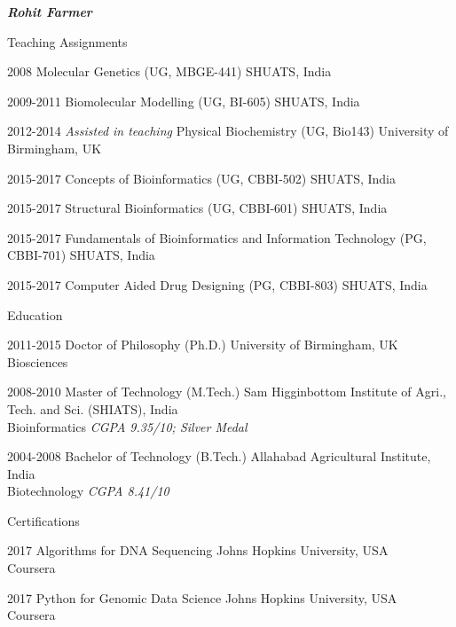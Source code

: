 \documentclass[10pt]{article}
\begin{document}
\begin{cv}{\huge \it \bfseries Rohit Farmer}
\begin{cvlist}{Teaching Assignments}
	\item[2008] Molecular Genetics (UG, MBGE-441) \hfill SHUATS, India 
	\item[2009-2011] Biomolecular Modelling (UG, BI-605)  \hfill SHUATS, India
	\item[2012-2014] \emph{Assisted in teaching} Physical Biochemistry (UG, Bio143) \hfill University of Birmingham, UK
	\item[2015-2017] Concepts of Bioinformatics (UG, CBBI-502) \hfill SHUATS, India 
	\item[2015-2017] Structural Bioinformatics (UG, CBBI-601)  \hfill SHUATS, India 
	\item[2015-2017] Fundamentals of Bioinformatics and Information Technology (PG, CBBI-701) \hfill SHUATS, India
	\item[2015-2017] Computer Aided Drug Designing (PG, CBBI-803) \hfill SHUATS, India
\end{cvlist}

\begin{cvlist}{Education}
	\item[2011-2015] Doctor of Philosophy (Ph.D.) \hfill University of Birmingham, UK \\ Biosciences
	\item[2008-2010] Master of Technology (M.Tech.) \hfill Sam Higginbottom Institute of Agri., Tech. and Sci. (SHIATS), India  \\ Bioinformatics \emph{CGPA 9.35/10; Silver Medal}
	\item[2004-2008] Bachelor of Technology (B.Tech.) \hfill Allahabad Agricultural Institute, India  \\ Biotechnology \emph{CGPA 8.41/10}
\end{cvlist}

\begin{cvlist}{Certifications}
	\item[2017] Algorithms for DNA Sequencing \hfill Johns Hopkins University, USA  \\ \hspace*{\fill} Coursera
	\item[2017] Python for Genomic Data Science \hfill Johns Hopkins University, USA  \\ \hspace*{\fill} Coursera
\end{cvlist}


\end{cv}
\end{document}
